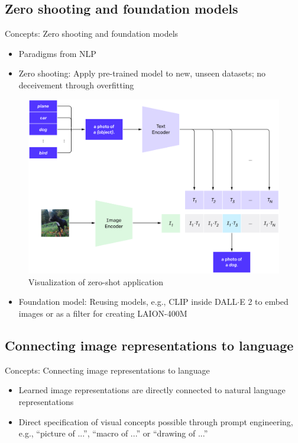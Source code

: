 \documentclass[xcolor=dvipsnames]{beamer}
\begin{document}
\subsection{Zero shooting and foundation models} %
\begin{frame}{Concepts: Zero shooting and foundation models}
  \begin{itemize}
    \item Paradigms from NLP
    \item Zero shooting: Apply pre-trained model to new, unseen datasets; no deceivement through overfitting
  \end{itemize}

  \begin{figure}[ht]
    \begin{minipage}{0.67\textwidth}
      \centering
      \includegraphics[width=0.8\linewidth]{../../figures/02-04-text-support-img/zero-shooting}
    \end{minipage}
    \begin{minipage}[c]{0.3\textwidth}
      \caption{Visualization of zero-shot application \parencite{radford2021learning}}
    \end{minipage}
  \end{figure}

  \begin{itemize}
    \item Foundation model: Reusing models, e.g., CLIP inside DALL$\cdot$E 2 to embed images \parencite{ramesh2022hierarchical} or as a filter for creating LAION-400M \parencite{schuhmann2022laion}
  \end{itemize}
\end{frame}

\subsection{Connecting image representations to language}
\begin{frame}{Concepts: Connecting image representations to language}
  \begin{itemize}
    \item Learned image representations are directly connected to natural language representations
    \item Direct specification of visual concepts possible through prompt engineering, e.g., \enquote{picture of ...}, \enquote{macro of ...} or \enquote{drawing of ...}
  \end{itemize}
\end{frame}
\end{document}

